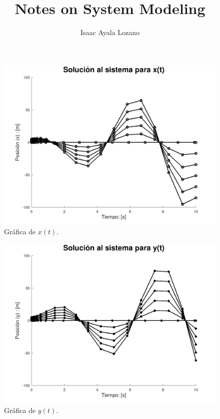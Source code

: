 \documentclass[12pt,letterpaper]{article}
\title{Notes on System Modeling}
\author{Isaac Ayala Lozano}
\date{}
\begin{document}
{}

\begin{figure}
 \centering
 \includegraphics[scale=0.2]{img/fig01.png}
 \caption{Gráfica de $x(t)$.}
\end{figure}

\begin{figure}
 \centering
 \includegraphics[scale=0.2]{img/fig02.png}
 \caption{Gráfica de $y(t)$.}
\end{figure}
\end{document}
